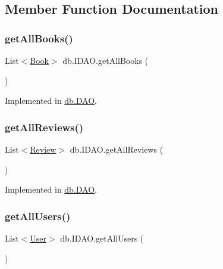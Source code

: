 \subsection{Member Function Documentation}
\mbox{\label{interfacedb_1_1_i_d_a_o_a75a5ebcd7c3421ae7cccc8e2f3b2d9f9}} 
\subsubsection{\texorpdfstring{get\+All\+Books()}{getAllBooks()}}
{\footnotesize\ttfamily List$<$\hyperlink{classserver_1_1data_1_1_book}{Book}$>$ db.\+I\+D\+A\+O.\+get\+All\+Books (\begin{DoxyParamCaption}{ }\end{DoxyParamCaption})}



Implemented in \hyperlink{classdb_1_1_d_a_o_a82a8c60ccd0de2f70b69bc36d29aeef8}{db.\+D\+AO}.

\mbox{\label{interfacedb_1_1_i_d_a_o_a3d9625d7e5426aad3c2e70fd0174e5f0}} 
\subsubsection{\texorpdfstring{get\+All\+Reviews()}{getAllReviews()}}
{\footnotesize\ttfamily List$<$\hyperlink{classserver_1_1data_1_1_review}{Review}$>$ db.\+I\+D\+A\+O.\+get\+All\+Reviews (\begin{DoxyParamCaption}{ }\end{DoxyParamCaption})}



Implemented in \hyperlink{classdb_1_1_d_a_o_a4df79c7d44b050aa55451db2ecf342f6}{db.\+D\+AO}.

\mbox{\label{interfacedb_1_1_i_d_a_o_a88b60729d9517ca9aa31b7db7ae07aee}} 
\subsubsection{\texorpdfstring{get\+All\+Users()}{getAllUsers()}}
{\footnotesize\ttfamily List$<$\hyperlink{classserver_1_1data_1_1_user}{User}$>$ db.\+I\+D\+A\+O.\+get\+All\+Users (\begin{DoxyParamCaption}{ }\end{DoxyParamCaption})}



